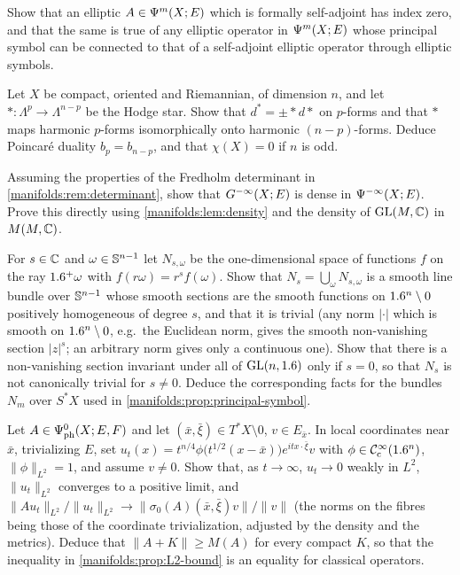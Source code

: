 \begin{exercise}\label{manifolds:ex:index-zero}
Show that an elliptic $A\in\Psi^{m}(X;E)$ which is formally self-adjoint has index zero,
and that the same is true of any elliptic operator in $\Psi^{m}(X;E)$ whose principal
symbol can be connected to that of a self-adjoint elliptic operator through elliptic
symbols.
\end{exercise}

\begin{exercise}\label{manifolds:ex:poincare}
Let $X$ be compact, oriented and Riemannian, of dimension $n$, and let
$*:\Lambda^p\to\Lambda^{n-p}$ be the Hodge star. Show that $d^*=\pm*d*$ on $p$-forms and that
$*$ maps harmonic $p$-forms isomorphically onto harmonic $(n-p)$-forms. Deduce Poincar\'e
duality $b_p=b_{n-p}$, and that $\chi(X)=0$ if $n$ is odd.
\end{exercise}

\begin{exercise}\label{manifolds:ex:G-dense}
Assuming the properties of the Fredholm determinant in
\cref{manifolds:rem:determinant}, show that $G^{-\infty}(X;E)$ is dense in
$\Psi^{-\infty}(X;E)$. Prove this directly using \cref{manifolds:lem:density} and the
density of $\operatorname{GL}(M,\mathbb{C})$ in $M(M,\mathbb{C})$.
\end{exercise}

\begin{exercise}\label{manifolds:ex:homogeneous-bundle}
For $s\in\mathbb{C}$ and $\omega\in\mathbb{S}^{n-1}$ let $N_{s,\omega}$ be the one-dimensional space of
functions $f$ on the ray $1.6^+\omega$ with $f(r\omega)=r^sf(\omega)$. Show that
$N_s=\bigcup_\omega N_{s,\omega}$ is a smooth line bundle over $\mathbb{S}^{n-1}$ whose smooth
sections are the smooth functions on $1.6^n\setminus0$ positively homogeneous of degree $s$,
and that it is trivial (any norm $|\cdot|$ which is smooth on $1.6^n\setminus0$, e.g.\ the
Euclidean norm, gives the smooth non-vanishing section $|z|^s$; an arbitrary norm gives
only a continuous one). Show
that there is a non-vanishing section invariant under all of $\operatorname{GL}(n,1.6)$ only if $s=0$,
so that $N_s$ is not canonically trivial for $s\ne0$. Deduce the corresponding facts for
the bundles $N_m$ over $S^*X$ used in \cref{manifolds:prop:principal-symbol}.
\end{exercise}

\begin{exercise}\label{manifolds:ex:essential-norm}
Let $A\in\Psi^{0}_{\mathrm{ph}}(X;E,F)$ and let $(\bar x,\bar\xi)\in T^*X\setminus0$,
$v\in E_{\bar x}$. In local coordinates near $\bar x$, trivializing $E$, set
$u_t(x)=t^{n/4}\phi\big(t^{1/2}(x-\bar x)\big)e^{itx\cdot\bar\xi}v$ with $\phi\in\mathcal{C}^\infty_{\mathrm{c}}(1.6^n)$,
$\|\phi\|_{L^2}=1$, and assume $v\ne0$. Show that, as $t\to\infty$, $u_t\to0$ weakly in $L^2$, $\|u_t\|_{L^2}$
converges to a positive limit, and
$\|Au_t\|_{L^2}/\|u_t\|_{L^2}\to\|\sigma_0(A)(\bar x,\bar\xi)v\|/\|v\|$ (the norms on the fibres being
those of the coordinate trivialization, adjusted by the density and the metrics). Deduce
that $\|A+K\|\ge M(A)$ for every compact $K$, so that the inequality in
\cref{manifolds:prop:L2-bound} is an equality for classical operators.
\end{exercise}

